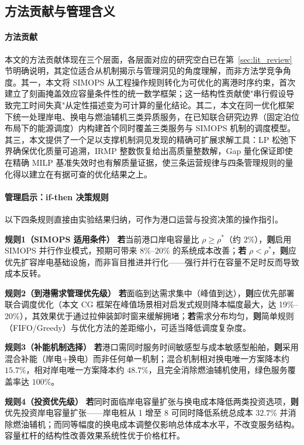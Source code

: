 \documentclass[UTF8, a4paper, 12pt]{ctexart}
\theoremstyle{plain}
\theoremstyle{definition}
\theoremstyle{remark}
\begin{document}
\subsection{方法贡献与管理含义}
\label{sec:contributions}

\paragraph{方法贡献}
本文的方法贡献体现在三个层面，各层面对应的研究空白已在第~\ref{sec:lit_review} 节明确说明，其定位适合从机制揭示与管理洞见的角度理解，而非方法学竞争角度。其一，本文将 SIMOPS 从工程操作规则转化为可优化的离港时序约束，首次建立了刻画掩盖效应容量条件性的统一数学框架；这一结构性贡献使"串行假设导致完工时间失真"从定性描述变为可计算的量化结论。其二，本文在同一优化框架下统一处理岸电、换电与燃油辅机三类异质服务，在已知联合研究边界（固定泊位布局下的能源调度）内构建首个同时覆盖三类服务与 SIMOPS 机制的调度模型。其三，本文提供了一个足以支撑机制洞见发现的精确可扩展求解工具：LP 松弛下界确保优化质量可追溯，IRMP 整数恢复给出高质量整数解，Gap 量化保证即使在精确 MILP 基准失效时也有解质量证据，使三条运营规律与四条管理规则的量化得以建立在有据可查的优化结果之上。

\paragraph{管理启示：if-then 决策规则}
以下四条规则直接由实验结果归纳，可作为港口运营与投资决策的操作指引。

\textbf{规则1（SIMOPS 适用条件）}
\textbf{若}当前港口岸电容量比 $\rho \ge \rho^*$（约 $2\%$），\textbf{则}启用 SIMOPS 并行作业模式，预期可带来 $8\%$--$20\%$ 的系统成本改善；\textbf{若} $\rho < \rho^*$，\textbf{则}应优先扩容岸电基础设施，而非盲目推进并行化——强行并行在容量不足时反而导致成本反转。

\textbf{规则2（到港需求管理优先级）}
\textbf{若}面临到达需求集中（峰值到达），\textbf{则}应优先部署联合调度优化（本文 CG 框架在峰值场景相对启发式规则降本幅度最大，达 19\%--20\%），其效果优于通过拉伸装卸时窗来缓解拥堵；\textbf{若}需求分布均匀，\textbf{则}简单规则（FIFO/Greedy）与优化方法的差距缩小，可适当降低调度复杂度。

\textbf{规则3（补能机制选择）}
\textbf{若}港口需同时服务时间敏感型与成本敏感型船舶，\textbf{则}采用混合补能（岸电+换电）而非任何单一机制；混合机制相对换电唯一方案降本约 $15.7\%$，相对岸电唯一方案降本约 $48.7\%$，且完全消除燃油辅机使用，绿色服务覆盖率达 $100\%$。

\textbf{规则4（投资优先级）}
\textbf{若}同时面临岸电容量扩张与换电成本降低两类投资选项，\textbf{则}优先投资岸电容量扩张——岸电桩从 1 增至 8 可同时降低系统总成本 $32.7\%$ 并消除燃油辅机；而同等幅度的换电成本调整仅影响总体成本水平，不改变服务结构。容量杠杆的结构性改善效果系统性优于价格杠杆。
\end{document}
